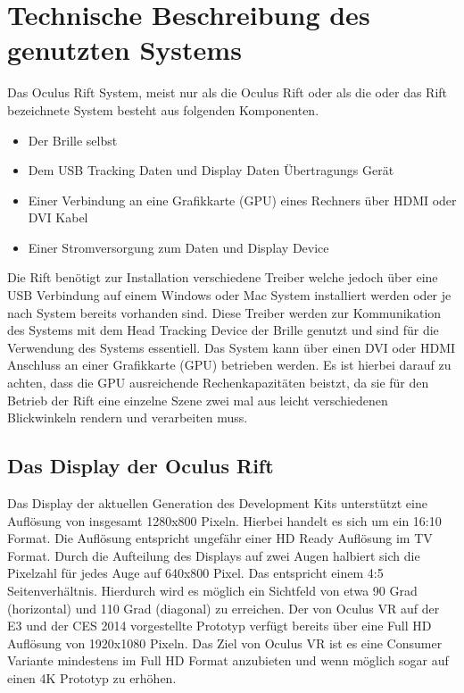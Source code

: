 \documentclass[pagesize, paper=a4, fontsize=12pt,titlepage=true, headings=small, headnosepline, abstractoff, liststotoc, nochapterprefix, plainheadsepline]{scrreprt}
\begin{document}
\section{Technische Beschreibung des genutzten Systems}
Das Oculus Rift System, meist nur als die Oculus Rift oder als die oder das Rift bezeichnete System besteht aus folgenden Komponenten.
\begin{itemize}
\item Der Brille selbst
\item Dem USB Tracking Daten und Display Daten Übertragungs Gerät
\item Einer Verbindung an eine Grafikkarte (GPU) eines Rechners über HDMI oder DVI Kabel
\item Einer Stromversorgung zum Daten und Display Device
\end{itemize}
Die Rift benötigt zur Installation verschiedene Treiber welche jedoch über eine USB Verbindung auf einem Windows oder Mac System installiert werden oder je nach System bereits vorhanden sind. Diese Treiber werden zur Kommunikation des Systems mit dem Head Tracking Device der Brille genutzt und sind für die Verwendung des Systems essentiell. Das System kann über einen DVI oder HDMI Anschluss an einer Grafikkarte (GPU) betrieben werden. Es ist hierbei darauf zu achten, dass die GPU ausreichende Rechenkapazitäten beistzt, da sie für den Betrieb der Rift eine einzelne Szene zwei mal aus leicht verschiedenen Blickwinkeln rendern und verarbeiten muss.

\subsection{Das Display der Oculus Rift}
Das Display der aktuellen Generation des Development Kits unterstützt eine Auflösung von insgesamt 1280x800 Pixeln. Hierbei handelt es sich um ein 16:10 Format. Die Auflösung entspricht ungefähr einer HD Ready Auflösung im TV Format. Durch die Aufteilung des Displays auf zwei Augen halbiert sich die Pixelzahl für jedes Auge auf 640x800 Pixel. Das entspricht einem 4:5 Seitenverhältnis. Hierdurch wird es möglich ein Sichtfeld von etwa 90 Grad (horizontal) und 110 Grad (diagonal) zu erreichen. Der von Oculus VR auf der E3 und der CES 2014 vorgestellte Prototyp verfügt bereits über eine Full HD Auflösung von 1920x1080 Pixeln. Das Ziel von Oculus VR ist es eine Consumer Variante mindestens im Full HD Format anzubieten und wenn möglich sogar auf einen 4K Prototyp zu erhöhen.
\end{document}
